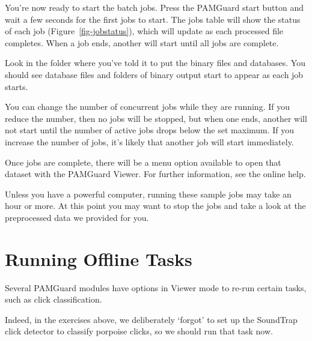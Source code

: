 \documentclass[
]{article}
\begin{document}
You're now ready to start the batch jobs. Press the PAMGuard start
button and wait a few seconds for the first jobs to start. The jobs
table will show the status of each job (Figure~\ref{fig-jobstatus}),
which will update as each processed file completes. When a job ends,
another will start until all jobs are complete.

Look in the folder where you've told it to put the binary files and
databases. You should see database files and folders of binary output
start to appear as each job starts.

You can change the number of concurrent jobs while they are running. If
you reduce the number, then no jobs will be stopped, but when one ends,
another will not start until the number of active jobs drops below the
set maximum. If you increase the number of jobs, it's likely that
another job will start immediately.

Once jobs are complete, there will be a menu option available to open
that dataset with the PAMGuard Viewer. For further information, see the
online help.

\begin{tcolorbox}[enhanced jigsaw, coltitle=black, colframe=quarto-callout-tip-color-frame, opacityback=0, arc=.35mm, toptitle=1mm, toprule=.15mm, title=\textcolor{quarto-callout-tip-color}{\faLightbulb}\hspace{0.5em}{Impatient people}, left=2mm, opacitybacktitle=0.6, bottomtitle=1mm, breakable, bottomrule=.15mm, titlerule=0mm, colback=white, rightrule=.15mm, colbacktitle=quarto-callout-tip-color!10!white, leftrule=.75mm]

Unless you have a powerful computer, running these sample jobs may take
an hour or more. At this point you may want to stop the jobs and take a
look at the preprocessed data we provided for you.

\end{tcolorbox}

\section{Running Offline Tasks}\label{running-offline-tasks}

Several PAMGuard modules have options in Viewer mode to re-run certain
tasks, such as click classification.

Indeed, in the exercises above, we deliberately `forgot' to set up the
SoundTrap click detector to classify porpoise clicks, so we should run
that task now.
\end{document}
